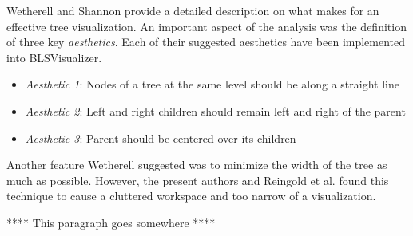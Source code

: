 \documentclass{sigchi}
\newcommand\Peter[1]{{\color{red}#1}}	%
\begin{document}
Wetherell and Shannon \cite{wetherell1979tidy} provide a detailed description on what makes for an effective tree visualization. An important aspect of the analysis was the definition of three key \textit{aesthetics}. Each of their suggested aesthetics have been implemented into BLSVisualizer.

\begin{itemize}
\item \textit{Aesthetic 1}: Nodes of a tree at the same level should be along a straight line
\item \textit{Aesthetic 2}: Left and right children should remain left and right of the parent
\item \textit{Aesthetic 3}: Parent should be centered over its children
\end{itemize}

Another feature Wetherell suggested was to minimize the width of the tree as much as possible. However, the present authors and Reingold et al. \cite{reingold1981tidier} found this technique to cause a cluttered workspace and too narrow of a visualization.

**** This paragraph goes somewhere ****

\end{document}
